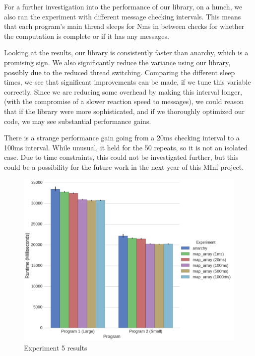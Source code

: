 For a further investigation into the performance of our library, on a hunch, we also ran the experiment with different message checking intervals. This means that each program's main thread sleeps for Nms in between checks for whether the computation is complete or if it has any messages.

Looking at the results, our library is consistently faster than anarchy, which is a promising sign. We also significantly reduce the variance using our library, possibly due to the reduced thread switching. Comparing the different sleep times, we see that significant improvements can be made, if we tune this variable correctly. Since we are reducing some overhead by making this interval longer, (with the compromise of a slower reaction speed to messages), we could reason that if the library were more sophisticated, and if we thoroughly optimized our code, we may see substantial performance gains.

There is a strange performance gain going from a 20ms checking interval to a 100ms interval. While unusual, it held for the 50 repeats, so it is not an isolated case. Due to time constraints, this could not be investigated further, but this could be a possibility for the future work in the next year of this MInf project.



\begin{figure}
	\centering
	\includegraphics[width=\textwidth]{graphics/experiment5.png}
	\caption{Experiment 5 results}
	\label{fig:results_ex5}
\end{figure}

